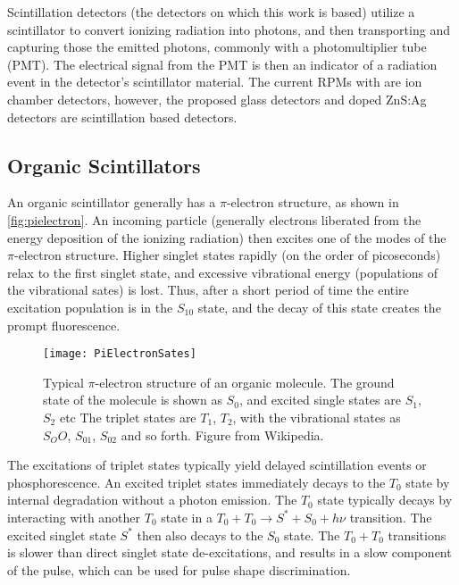 Scintillation detectors (the detectors on which this work is based) utilize a scintillator to convert ionizing radiation into photons, and then transporting and capturing those the emitted photons, commonly with a photomultiplier tube (PMT).
The electrical signal from the PMT is then an indicator of a radiation event in the detector's scintillator material.
The current RPMs with  are ion chamber detectors, however, the proposed  glass detectors and  doped ZnS:Ag detectors are scintillation based detectors. 

\subsection{Organic Scintillators}
An organic scintillator generally has a $\pi$-electron structure, as shown in \autoref{fig:pielectron}.
An incoming particle (generally electrons liberated from the energy deposition of the ionizing radiation) then excites one of the modes of the $\pi$-electron structure.
Higher singlet states rapidly (on the order of picoseconds) relax to the first singlet state, and excessive vibrational energy (populations of the vibrational sates) is lost.
Thus, after a short period of time the entire excitation population is in the $S_10$ state, and the decay of this state creates the prompt fluorescence.
\begin{figure}
  \centering
  \texttt{[image: PiElectronSates]}
  \caption[$\pi$ Electron Structure]{Typical $\pi$-electron structure of an organic molecule. The ground state of the molecule is shown as $S_0$, and excited single states are $S_1$, $S_2$ etc The triplet states are $T_1$, $T_2$, with the vibrational states as $S_OO$, $S_01$, $S_02$ and so forth. Figure from Wikipedia.}
  \label{fig:pielectron}
\end{figure}
The excitations of triplet states typically yield delayed scintillation events or phosphorescence.
An excited triplet states immediately decays to the $T_0$ state by internal degradation without a photon emission.
The $T_0$ state typically decays by interacting with another $T_0$ state in a $T_0 + T_0 \to S^* + S_0 + h\nu$ transition.
The excited singlet state $S^*$ then also decays to the $S_0$ state.
The $T_0 + T_0$ transitions is slower than direct singlet state de-excitations, and results in a slow component of the pulse, which can be used for pulse shape discrimination.

